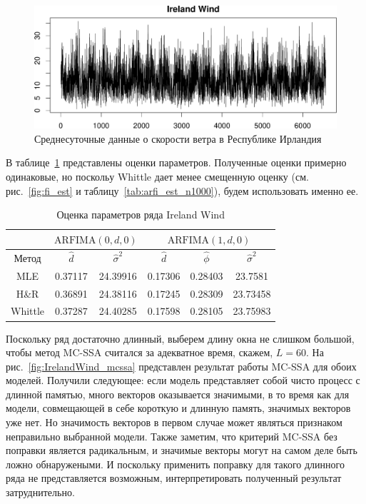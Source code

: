 \documentclass[specialist,
substylefile = spbu_report.rtx,
subf,href,colorlinks=true, 12pt]{disser}
\theoremstyle{definition}
\begin{document}
\begin{figure}[h]
	\centering
	\includegraphics[width=\textwidth]{img/IrelandWind_ts.pdf}
	\caption{Среднесуточные данные о скорости ветра в Республике Ирландия}
	\label{fig:IrelandWind_ts}
\end{figure}

В таблице~\ref{tab:IrelandWind_est} представлены оценки параметров. Полученные оценки примерно одинаковые, но поскольу Whittle дает менее смещенную оценку (см. рис.~\ref{fig:fi_est} и таблицу~\ref{tab:arfi_est_n1000}), будем использовать именно ее.

\begin{table}[b]
	\centering
	\caption{Оценка параметров ряда Ireland Wind}
	\label{tab:IrelandWind_est}
	\begin{tabular}{|c|c|c|c|c|c|}
		\cline{2-6}
		\multicolumn{1}{c|}{} & \multicolumn{2}{c|}{$\mathrm{ARFIMA}(0, d, 0)$} & \multicolumn{3}{c|}{$\mathrm{ARFIMA}(1, d, 0)$} \\
		\hline
		Метод & $\hat d$ & $\hat\sigma^2$ & $\hat{d}$ & $\hat\phi$ & $\hat{\sigma}^2$ \\
		\hline
		MLE & 0.37117 & 24.39916 & 0.17306 & 0.28403 & 23.7581 \\
		H\&R & 0.36891 & 24.38116 & 0.17245 & 0.28309 & 23.73458 \\
		Whittle & 0.37287 & 24.40285 & 0.17598 & 0.28105 & 23.75983 \\
		\hline
	\end{tabular}
\end{table}

Поскольку ряд достаточно длинный, выберем длину окна не слишком большой, чтобы метод MC-SSA считался за адекватное время, скажем, $L=60$. На рис.~\ref{fig:IrelandWind_mcssa} представлен результат работы MC-SSA для обоих моделей. Получили следующее: если модель представляет собой чисто процесс с длинной памятью, много векторов оказывается значимыми, в то время как для модели, совмещающей в себе короткую и длинную память, значимых векторов уже нет. Но значимость векторов в первом случае может являться признаком неправильно выбранной модели. Также заметим, что критерий MC-SSA без поправки является радикальным, и значимые векторы могут на самом деле быть ложно обнаружеными. И поскольку применить поправку для такого длинного ряда не представляется возможным, интерпретировать полученный результат затруднительно. 
\end{document}
